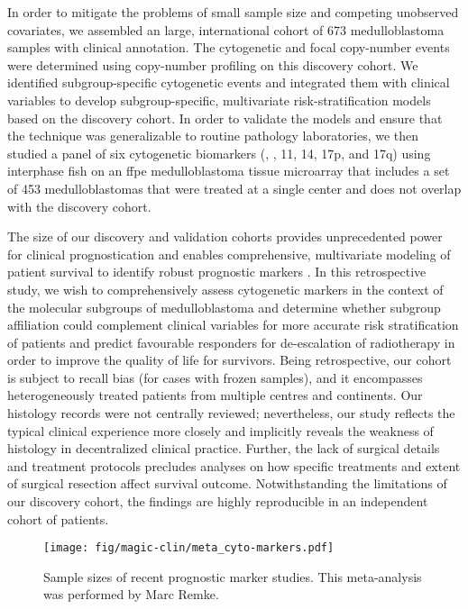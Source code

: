 In order to mitigate the problems of small sample size and competing unobserved covariates, we assembled an large, international cohort of 673 medulloblastoma samples with clinical annotation. The cytogenetic and focal copy-number events were determined using copy-number profiling on this discovery cohort. We identified subgroup-specific cytogenetic events and integrated them with clinical variables to develop subgroup-specific, multivariate risk-stratification models based on the discovery cohort. In order to validate the models and ensure that the technique was generalizable to routine pathology laboratories, we then studied a panel of six cytogenetic biomarkers (, , 11, 14, 17p, and 17q) using interphase \gls{fish} on an \gls{ffpe} medulloblastoma tissue microarray that includes a set of 453 medulloblastomas that were treated at a single center and does not overlap with the discovery cohort.

The size of our discovery and validation cohorts provides unprecedented power for clinical prognostication and enables comprehensive, multivariate modeling of patient survival to identify robust prognostic markers . In this retrospective study, we wish to comprehensively assess cytogenetic markers in the context of the molecular subgroups of medulloblastoma and determine whether subgroup affiliation could complement clinical variables for more accurate risk stratification of patients and predict favourable responders for de-escalation of radiotherapy in order to improve the quality of life for survivors. Being retrospective, our cohort is subject to recall bias (for cases with frozen samples), and it encompasses heterogeneously treated patients from multiple centres and continents. Our histology records were not centrally reviewed; nevertheless, our study reflects the typical clinical experience more closely and implicitly reveals the weakness of histology in decentralized clinical practice. Further, the lack of surgical details and treatment protocols precludes analyses on how specific treatments and extent of surgical resection affect survival outcome. Notwithstanding the limitations of our discovery cohort, the findings are highly reproducible in an independent cohort of patients.

\begin{SCfigure}[5][t]
	\texttt{[image: fig/magic-clin/meta\_cyto-markers.pdf]}
	\caption[Sample sizes of recent prognostic marker studies]
	{
	Sample sizes of recent prognostic marker studies.
	This meta-analysis was performed by Marc Remke.
	}
	\label{fig:meta_cyto-markers}
\end{SCfigure}

